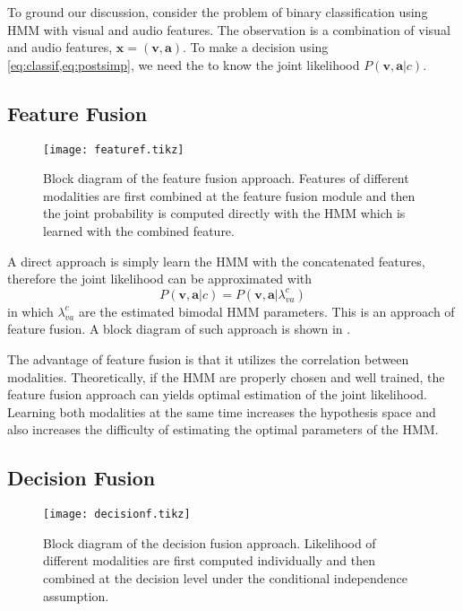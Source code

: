 \documentclass[12pt,final,twoside]{report}
\begin{document}
To ground our discussion, consider the problem of binary classification using HMM with visual and audio features. The observation is a combination of visual and audio features, $\mathbf{x} = (\mathbf{v}, \mathbf{a})$. To make a decision using \cref{eq:classif,eq:postsimp}, we need the to know the joint likelihood $P(\mathbf{v},\mathbf{a}|c)$.

\subsection{Feature Fusion}
\begin{figure}[t]
  \centering
  \texttt{[image: featuref.tikz]}
  \caption[Block diagram of the feature fusion approach.]{Block diagram of the feature fusion approach. Features of different modalities are first combined at the feature fusion module and then the joint probability is computed directly with the HMM which is learned with the combined feature.}
  \label{fig:featuref}
\end{figure}

A direct approach is simply learn the HMM with the concatenated features, therefore the joint likelihood can be approximated with 
\begin{equation}
  P(\mathbf{v},\mathbf{a}|c) = P(\mathbf{v},\mathbf{a}|\lambda_{va}^c)
\end{equation}
in which $\lambda_{va}^c$ are the estimated bimodal HMM parameters. This is an approach of feature fusion. A block diagram of such approach is shown in .

The advantage of feature fusion is that it utilizes the correlation between modalities. Theoretically, if the HMM are properly chosen and well trained, the feature fusion approach can yields optimal estimation of the joint likelihood. Learning both modalities at the same time increases the hypothesis space and also increases the difficulty of estimating the optimal parameters of the HMM.

\subsection{Decision Fusion}
\begin{figure}[t]
  \centering
  \texttt{[image: decisionf.tikz]}
  \caption[Block diagram of the decision fusion approach.]{Block diagram of the decision fusion approach. Likelihood of different modalities are first computed individually and then combined at the decision level under the conditional independence assumption.}
  \label{fig:decisionf}
\end{figure}
\end{document}
